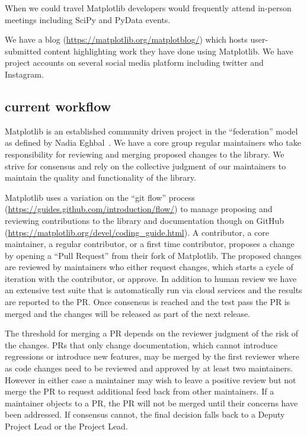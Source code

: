 \documentclass[12pt]{article}
\numberwithin{page}{section}
\begin{document}
When we could travel Matplotlib developers would frequently attend
in-person meetings including SciPy and PyData events.

We have a blog (\url{https://matplotlib.org/matplotblog/}) which hosts
user-submitted content highlighting work they have done using
Matplotlib.  We have project accounts on several social media platform
including twitter and Instagram.


\subsection{current workflow}


Matplotlib is an established community driven project in the
``federation'' model as defined by Nadia Eghbal~\cite{eghbal_2020}.  We
have a core group regular maintainers who take responsibility for
reviewing and merging proposed changes to the library.  We strive for
consensus and rely on the collective judgment of our maintainers to maintain
the quality and functionality of the library.

Matplotlib uses a variation on the ``git flow'' process
(\url{https://guides.github.com/introduction/flow/}) to manage
proposing and reviewing contributions to the library and documentation
though on GitHub
(\url{https://matplotlib.org/devel/coding_guide.html}).  A
contributor, a core maintainer, a regular contributor, or a first time
contributor, proposes a change by opening a ``Pull Request'' from
their fork of Matplotlib.  The proposed changes are reviewed by
maintainers who either request changes, which starts a cycle of
iteration with the contributor, or approve.  In addition to human
review we have an extensive test suite that is automatically run via
cloud services and the results are reported to the PR.  Once consensus
is reached and the test pass the PR is merged and the changes will be
released as part of the next release.

The threshold for merging a PR depends on the reviewer judgment of the
risk of the changes.  PRs that only change documentation, which cannot
introduce regressions or introduce new features, may be merged by the
first reviewer where as code changes need to be reviewed and approved
by at least two maintainers.  However in either case a maintainer may
wish to leave a positive review but not merge the PR to request
additional feed back from other maintainers.  If a maintainer objects
to a PR, the PR will not be merged until their concerns have been
addressed.  If consensus cannot, the final decision falls back to a
Deputy Project Lead or the Project Lead.
\end{document}
